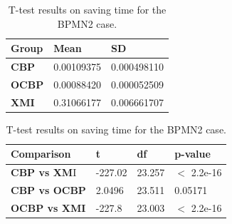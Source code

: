 \documentclass{llncs}
\begin{document}
    \begin{table}[ht]
        \centering
        \label{table:ttest_save_time_bpmn2}
        \caption{T-test results on saving time for the BPMN2 case.}
        \begin{minipage}{0.44\textwidth}
            \centering
            \begin{tabular}{|p{}|p{}|p{}|}
                \hline 
                \textbf{Group}  & \textbf{Mean} & \textbf{SD} \\ 
                \hline 
                \textbf{CBP} &0.00109375    &0.000498110 \\ 
                \hline 
                \textbf{OCBP} &0.00088420   &0.000052509  \\ 
                \hline 
                \textbf{XMI} & 0.31066177   & 0.006661707 \\ 
                \hline 
            \end{tabular} 
        \end{minipage}
        \hfill
        \begin{minipage}{0.54\textwidth}
            \centering
            \begin{tabular}{|p{}|p{}|p{}|p{}|}
                \hline 
                \textbf{Comparison} & \textbf{t}  & \textbf{df} & \textbf{p-value} \\ 
                \hline 
                \textbf{CBP vs XM}I & -227.02    &23.257 & $<$ 2.2e-16 \\ 
                \hline 
                \textbf{CBP vs OCBP} & 2.0496 & 23.511  &0.05171 \\ 
                \hline 
                \textbf{OCBP vs XMI} & -227.8    & 23.003  & $<$ 2.2e-16 \\ 
                \hline 
            \end{tabular} 
        \end{minipage}
    \end{table}
    
\end{document}
